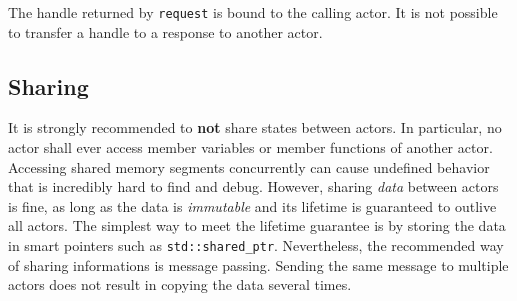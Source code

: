 The handle returned by \lstinline^request^ is bound to the calling actor. It is
not possible to transfer a handle to a response to another actor.

\clearpage
\subsection{Sharing}

It is strongly recommended to \textbf{not} share states between actors. In
particular, no actor shall ever access member variables or member functions of
another actor. Accessing shared memory segments concurrently can cause undefined
behavior that is incredibly hard to find and debug. However, sharing
\textit{data} between actors is fine, as long as the data is \textit{immutable}
and its lifetime is guaranteed to outlive all actors. The simplest way to meet
the lifetime guarantee is by storing the data in smart pointers such as
\lstinline^std::shared_ptr^. Nevertheless, the recommended way of sharing
informations is message passing. Sending the same message to multiple actors
does not result in copying the data several times.
